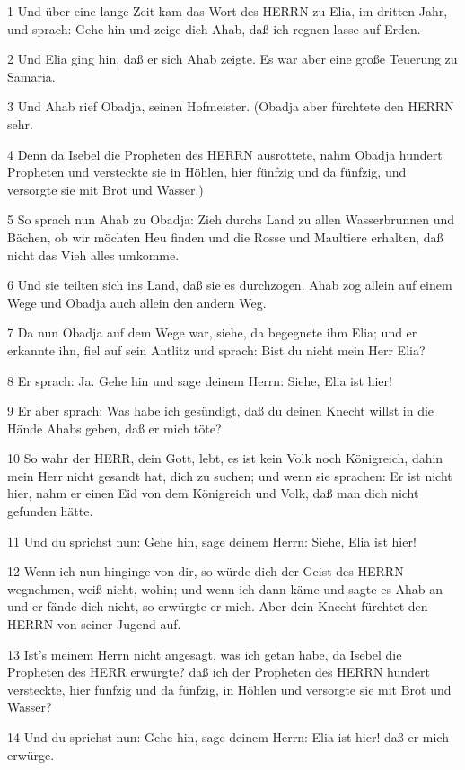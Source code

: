 \par 1 Und über eine lange Zeit kam das Wort des HERRN zu Elia, im dritten Jahr, und sprach: Gehe hin und zeige dich Ahab, daß ich regnen lasse auf Erden.
\par 2 Und Elia ging hin, daß er sich Ahab zeigte. Es war aber eine große Teuerung zu Samaria.
\par 3 Und Ahab rief Obadja, seinen Hofmeister. (Obadja aber fürchtete den HERRN sehr.
\par 4 Denn da Isebel die Propheten des HERRN ausrottete, nahm Obadja hundert Propheten und versteckte sie in Höhlen, hier fünfzig und da fünfzig, und versorgte sie mit Brot und Wasser.)
\par 5 So sprach nun Ahab zu Obadja: Zieh durchs Land zu allen Wasserbrunnen und Bächen, ob wir möchten Heu finden und die Rosse und Maultiere erhalten, daß nicht das Vieh alles umkomme.
\par 6 Und sie teilten sich ins Land, daß sie es durchzogen. Ahab zog allein auf einem Wege und Obadja auch allein den andern Weg.
\par 7 Da nun Obadja auf dem Wege war, siehe, da begegnete ihm Elia; und er erkannte ihn, fiel auf sein Antlitz und sprach: Bist du nicht mein Herr Elia?
\par 8 Er sprach: Ja. Gehe hin und sage deinem Herrn: Siehe, Elia ist hier!
\par 9 Er aber sprach: Was habe ich gesündigt, daß du deinen Knecht willst in die Hände Ahabs geben, daß er mich töte?
\par 10 So wahr der HERR, dein Gott, lebt, es ist kein Volk noch Königreich, dahin mein Herr nicht gesandt hat, dich zu suchen; und wenn sie sprachen: Er ist nicht hier, nahm er einen Eid von dem Königreich und Volk, daß man dich nicht gefunden hätte.
\par 11 Und du sprichst nun: Gehe hin, sage deinem Herrn: Siehe, Elia ist hier!
\par 12 Wenn ich nun hinginge von dir, so würde dich der Geist des HERRN wegnehmen, weiß nicht, wohin; und wenn ich dann käme und sagte es Ahab an und er fände dich nicht, so erwürgte er mich. Aber dein Knecht fürchtet den HERRN von seiner Jugend auf.
\par 13 Ist's meinem Herrn nicht angesagt, was ich getan habe, da Isebel die Propheten des HERR erwürgte? daß ich der Propheten des HERRN hundert versteckte, hier fünfzig und da fünfzig, in Höhlen und versorgte sie mit Brot und Wasser?
\par 14 Und du sprichst nun: Gehe hin, sage deinem Herrn: Elia ist hier! daß er mich erwürge.
